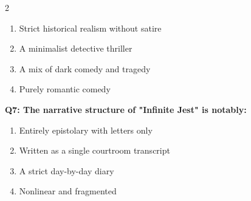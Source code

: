 \documentclass[10pt]{article}
\begin{document}
\begin{multicols}{2}
\begin{enumerate}[label=\arabic*.]
\item Strict historical realism without satire
\item A minimalist detective thriller
\item A mix of dark comedy and tragedy
\item Purely romantic comedy
\end{enumerate}
\textbf{Q7: The narrative structure of "Infinite Jest" is notably:}

\begin{enumerate}[label=\arabic*.]
\item Entirely epistolary with letters only
\item Written as a single courtroom transcript
\item A strict day-by-day diary
\item Nonlinear and fragmented
\end{enumerate}
\end{multicols}

\newpage
\end{document}
